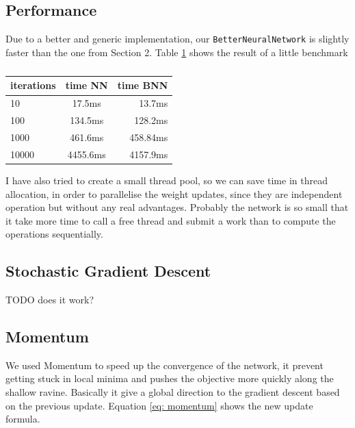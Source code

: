\documentclass[11pt]{article}
\begin{document}
\subsection{Performance}
Due to a better and generic implementation, our \texttt{BetterNeuralNetwork} is slightly faster than the one from Section 2. Table \ref{table: performance_NN_BNN} shows the result of a little benchmark
\begin{table}[H]
	\label{table: performance_NN_BNN}
\centering
  \begin{tabular}{ | l | c | r |}
    \hline
    iterations & time NN & time BNN\\ \hline
    10 & 17.5ms  & 13.7ms \\ \hline
    100 & 134.5ms  & 128.2ms \\ 
    1000 & 461.6ms  & 458.84ms \\ \hline
    10000 & 4455.6ms & 4157.9ms \\ \hline    
  \end{tabular}
  \caption{}
\end{table}
I have also tried to create a small thread pool, so we can save time in thread allocation, in order to parallelise the weight updates, since they are independent operation but without any real advantages. Probably the network is so small that it take more time to call a free thread and submit a work than to compute the operations  sequentially.
\subsection{Stochastic Gradient Descent}
TODO does it work?
\subsection{Momentum}
We used Momentum \cite{Ruder} to speed up the convergence of the network, it prevent getting stuck in local minima and pushes the objective more quickly along the shallow ravine. Basically it give a global direction to the gradient descent based on the previous update. Equation \ref{eq: momentum} shows the new update formula. 
\end{document}
